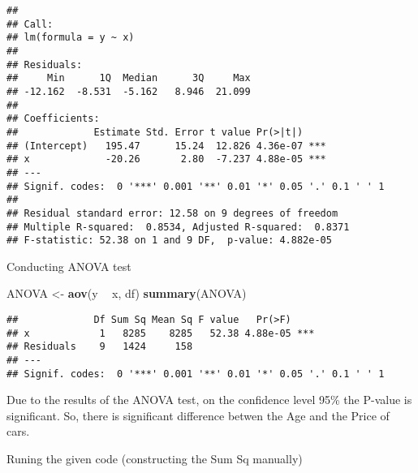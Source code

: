 \documentclass[12pt,]{article}
\newenvironment{Shaded}{\begin{snugshade}}{\end{snugshade}}
\newcommand{\KeywordTok}[1]{\textcolor[rgb]{0.13,0.29,0.53}{\textbf{#1}}}
\newcommand{\StringTok}[1]{\textcolor[rgb]{0.31,0.60,0.02}{#1}}
\newcommand{\OperatorTok}[1]{\textcolor[rgb]{0.81,0.36,0.00}{\textbf{#1}}}
\newcommand{\NormalTok}[1]{#1}
\begin{document}
\begin{verbatim}
## 
## Call:
## lm(formula = y ~ x)
## 
## Residuals:
##     Min      1Q  Median      3Q     Max 
## -12.162  -8.531  -5.162   8.946  21.099 
## 
## Coefficients:
##             Estimate Std. Error t value Pr(>|t|)    
## (Intercept)   195.47      15.24  12.826 4.36e-07 ***
## x             -20.26       2.80  -7.237 4.88e-05 ***
## ---
## Signif. codes:  0 '***' 0.001 '**' 0.01 '*' 0.05 '.' 0.1 ' ' 1
## 
## Residual standard error: 12.58 on 9 degrees of freedom
## Multiple R-squared:  0.8534, Adjusted R-squared:  0.8371 
## F-statistic: 52.38 on 1 and 9 DF,  p-value: 4.882e-05
\end{verbatim}

Conducting ANOVA test

\begin{Shaded}
\begin{Highlighting}[]
\NormalTok{ANOVA <-}\StringTok{ }\KeywordTok{aov}\NormalTok{(y }\OperatorTok{~}\StringTok{ }\NormalTok{x, df)}
\KeywordTok{summary}\NormalTok{(ANOVA)}
\end{Highlighting}
\end{Shaded}

\begin{verbatim}
##             Df Sum Sq Mean Sq F value   Pr(>F)    
## x            1   8285    8285   52.38 4.88e-05 ***
## Residuals    9   1424     158                     
## ---
## Signif. codes:  0 '***' 0.001 '**' 0.01 '*' 0.05 '.' 0.1 ' ' 1
\end{verbatim}

Due to the results of the ANOVA test, on the confidence level 95\% the
P-value is significant. So, there is significant difference betwen the
Age and the Price of cars.

Runing the given code (constructing the Sum Sq manually)
\end{document}
